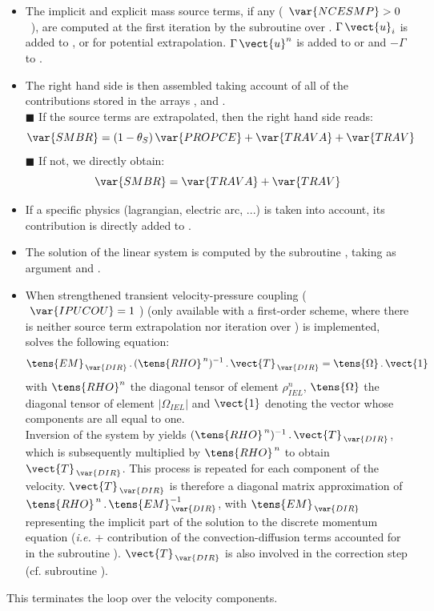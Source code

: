 \begin{itemize}
\item The implicit and explicit mass source terms, if any (~$\var{NCESMP}>0$~), are computed at the first iteration by the subroutine   over . $\Gamma\,\vect{u}_i$ is added to ,  or  for potential extrapolation. $\Gamma\,\vect{u}^n$ is added to  or  and
$-\Gamma$ to .
\\
\item The right hand side is then assembled taking account of all of the
contributions stored in the arrays ,  and
.\\
{\tiny$\blacksquare$} If the source terms are extrapolated, then the right hand side reads:
$$\var{SMBR}=(1-\theta_S)\,\var{PROPCE}+\var{TRAVA}+\var{TRAV}$$
{\tiny$\blacksquare$} If not, we directly obtain:
$$\var{SMBR}=\var{TRAVA}+\var{TRAV}$$

\item If a specific physics (lagrangian, electric arc, ...) is taken into account, its contribution is directly added to .
\\
\item The solution of the linear system is computed by the subroutine
, taking as argument  and .\\

\item When strengthened transient velocity-pressure coupling ($\ \var{IPUCOU} = 1\ $) (only available with a first-order scheme, where there is neither source term extrapolation nor iteration over ) is implemented,  solves the following equation:
\begin{equation}\label{Base_Predvv_Eq_Tdir}
\tens{EM}_{\,\var{DIR}}\,.\, (\tens{RHO}^{\,n})^{-1}\,.\,\vect{T}_{\,\var{DIR}} =
\tens{\Omega}\,.\,\vect{1}
\end{equation}
with $\tens{RHO}^n$ the diagonal tensor of element $\rho^{n}_{IEL}$,
$\tens{\Omega}$ the diagonal tensor of element $|\Omega_{IEL}|$ and $\vect{1}$ denoting the
vector whose components are all equal to one.\\
Inversion of the system by  yields
$(\tens{RHO}^{\,n})^{-1}\,.\,\vect{T}_{\,\var{DIR}}$, which is subsequently multiplied by $\tens{RHO}^{\,n}$
to obtain $\vect{T}_{\,\var{DIR}}$.
This process is repeated for each component  of the velocity. $\vect{T}_{\,\var{DIR}}$
is therefore a diagonal matrix approximation of
$\tens{RHO}^{\,n}\,.\,\tens{EM}_{\,\var{DIR}}^{-1}$, with
$\tens{EM}_{\,\var{DIR}}$ representing the implicit part of the solution to the discrete momentum equation (\emph{i.e.}  + contribution of the convection-diffusion terms accounted for in the subroutine
). $\vect{T}_{\,\var{DIR}}$ is also involved in the correction step (cf. subroutine ).\\
\end{itemize}
This terminates the loop over the velocity components.\\

